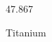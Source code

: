 \documentclass[12pt]{article}
\begin{document}
\hfill{}
\vfill
\begin{center}
  {\fontsize{50}{60}
  }

  47.867

Titanium
\end{center}
\vfill
\end{document}
